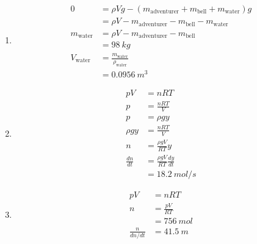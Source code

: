 \documentclass{article}
\begin{document}
\begin{enumerate}
  \item

        \begin{align*}
          0              & = \rho V g - (m_\text{adventurer} + m_\text{bell} + m_\text{water}) g \\
                         & = \rho V - m_\text{adventurer} - m_\text{bell} - m_\text{water}       \\
          m_\text{water} & = \rho V - m_\text{adventurer} - m_\text{bell}                        \\
                         & = \qty{98}{kg}                                                        \\
          V_\text{water} & = \frac{m_\text{water}}{\rho_\text{water}}                            \\
                         & = \qty{0.0956}{m^3}
        \end{align*}

  \item

        \begin{align*}
          p V             & = n R T                                \\
          p               & = \frac{n R T}{V}                      \\
          p               & = \rho g y                             \\
          \rho g y        & = \frac{n R T}{V}                      \\
          n               & = \frac{\rho g V}{R T} y               \\
          \frac{d n}{d t} & = \frac{\rho g V}{R T} \frac{d y}{d t} \\
                          & = \qty{18.2}{mol/s}
        \end{align*}

  \item

        \begin{align*}
          p V                 & = n R T           \\
          n                   & = \frac{p V}{R T} \\
                              & = \qty{756}{mol}  \\
          \frac{n}{d n / d t} & = \qty{41.5}{m}
        \end{align*}
\end{enumerate}
\end{document}
